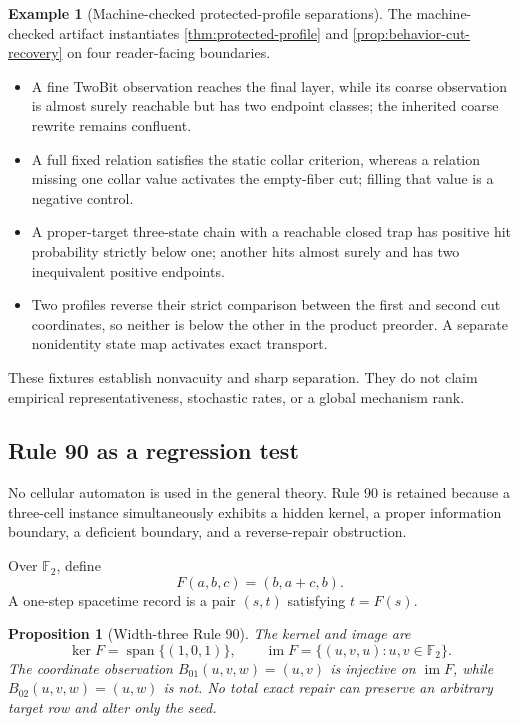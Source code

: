 \documentclass[11pt]{article}
\newtheorem{proposition}[theorem]{Proposition}
\theoremstyle{definition}
\newtheorem{example}[theorem]{Example}
\theoremstyle{remark}
\numberwithin{equation}{section}
\newcommand{\im}{\operatorname{im}}
\begin{document}
\begin{example}[Machine-checked protected-profile separations]
The machine-checked artifact instantiates \cref{thm:protected-profile} and
\cref{prop:behavior-cut-recovery} on four reader-facing boundaries.
\begin{itemize}
\item A fine TwoBit observation reaches the final layer, while its coarse
      observation is almost surely reachable but has two endpoint classes;
      the inherited coarse rewrite remains confluent.
\item A full fixed relation satisfies the static collar criterion, whereas a
      relation missing one collar value activates the empty-fiber cut; filling
      that value is a negative control.
\item A proper-target three-state chain with a reachable closed trap has
      positive hit probability strictly below one; another hits almost surely
      and has two inequivalent positive endpoints.
\item Two profiles reverse their strict comparison between the first and
      second cut coordinates, so neither is below the other in the product
      preorder.  A separate nonidentity state map activates exact transport.
\end{itemize}
These fixtures establish nonvacuity and sharp separation.  They do not claim
empirical representativeness, stochastic rates, or a global mechanism rank.
\end{example}

\subsection{Rule 90 as a regression test}\label{sec:rule90}

No cellular automaton is used in the general theory.  Rule 90 is retained because a three-cell instance simultaneously exhibits a hidden kernel, a proper information boundary, a deficient boundary, and a reverse-repair obstruction.

Over $\mathbb F_2$, define
\[
 F(a,b,c)=(b,a+c,b).
\]
A one-step spacetime record is a pair $(s,t)$ satisfying $t=F(s)$.

\begin{proposition}[Width-three Rule 90]
The kernel and image are
\[
 \ker F=\operatorname{span}\{(1,0,1)\},
 \qquad
 \im F=\{(u,v,u):u,v\in\mathbb F_2\}.
\]
The coordinate observation $B_{01}(u,v,w)=(u,v)$ is injective on $\im F$, while $B_{02}(u,v,w)=(u,w)$ is not.  No total exact repair can preserve an arbitrary target row and alter only the seed.
\end{proposition}
\end{document}

